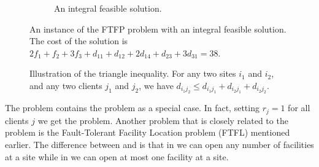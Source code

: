\documentclass[oneside,final]{ucr}
\def\dsp{\def\baselinestretch{2.0}\large\normalsize}
\def\ssp{\def\baselinestretch{1.0}\large\normalsize}
\begin{document}
\begin{figure}[ht]
\begin{subfigure}[b]{.45\textwidth}
  \caption{An integral feasible solution.}
  \end{subfigure}
  \caption[An instance of the FTFP problem with an integral
  feasible solution.]{An instance of the FTFP problem with an
    integral feasible solution. The cost of the solution is
    $2f_1 + f_2 + 3f_3 + d_{11} + d_{12} + 2d_{14} + d_{23}
    + 3d_{31} = 38$.}
  \label{fig:ftfp_example}
\end{figure}
\dsp
\ssp
\begin{figure}[ht]
  \centering
      \caption[Illustration of the triangle
      inequality.]{Illustration of the triangle inequality.
        For any two sites $i_1$ and $i_2$, and any two
        clients $j_1$ and $j_2$, we have $d_{i_1 j_2} \leq
        d_{i_1 j_1} + d_{i_2 j_1} + d_{i_2 j_2}$.}
  \label{fig:triangle}
\end{figure}
\dsp

The {\FTFP} problem contains the {\UFL} problem as a special
case. In fact, setting $r_j = 1$ for all clients $j$ we get
the {\UFL} problem. Another problem that is closely related
to the {\FTFP} problem is the Fault-Tolerant Facility
Location problem (FTFL) mentioned earlier. The difference
between {\FTFP} and {\FTFL} is that in {\FTFP} we can open
any number of facilities at a site while in {\FTFL} we can
open at most one facility at a site.
\end{document}
